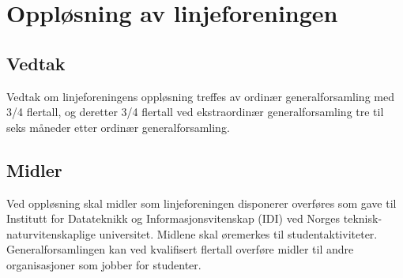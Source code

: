 \chapter{Oppløsning av linjeforeningen}
\section{Vedtak}

Vedtak om linjeforeningens oppløsning treffes av ordinær generalforsamling med 3/4 flertall, og deretter 3/4 flertall ved ekstraordinær generalforsamling tre til seks måneder etter ordinær generalforsamling.

\section{Midler}

Ved oppløsning skal midler som linjeforeningen disponerer overføres som gave til \mbox{Institutt} for Datateknikk og Informasjonsvitenskap (IDI) ved Norges teknisk-\linebreak naturvitenskaplige universitet. Midlene skal øremerkes til studentaktiviteter. Generalforsamlingen kan ved kvalifisert flertall overføre midler til andre organisasjoner som jobber for studenter.
